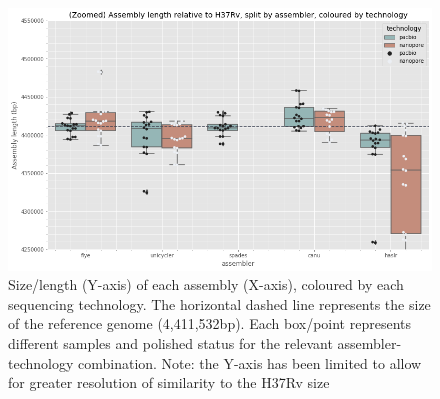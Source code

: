 \begin{figure}
\includegraphics[width=1.0\textwidth]{Chapter2/Figs/asm_len.png}
\centering
\caption{Size/length (Y-axis) of each assembly (X-axis), coloured by each sequencing technology. The horizontal dashed line represents the size of the \mtb{} reference genome (4,411,532bp). Each box/point represents different samples and polished status for the relevant assembler-technology combination. Note: the Y-axis has been limited to allow for greater resolution of similarity to the H37Rv size}
\label{fig:asm_len}
\end{figure}

